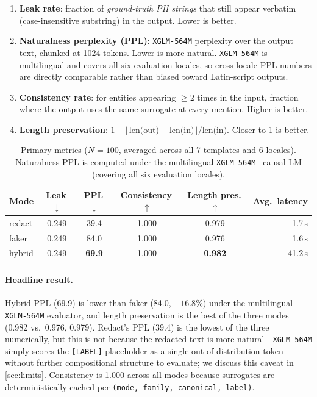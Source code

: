 \documentclass[11pt]{article}
\newcommand{\code}[1]{\texttt{#1}}
\newcommand{\xglm}{\code{XGLM-564M}}
\begin{document}
\begin{enumerate}[leftmargin=*, itemsep=2pt, topsep=2pt]
  \item \textbf{Leak rate}: fraction of \emph{ground-truth PII strings}
        that still appear verbatim (case-insensitive substring) in the
        output. Lower is better.
  \item \textbf{Naturalness perplexity (PPL)}: \xglm{} perplexity over
        the output text, chunked at 1024 tokens. Lower is more natural. \xglm{}
        is multilingual and covers all six evaluation locales, so
        cross-locale PPL numbers are directly comparable rather than
        biased toward Latin-script outputs.
  \item \textbf{Consistency rate}: for entities appearing $\ge 2$ times
        in the input, fraction where the output uses the same surrogate
        at every mention. Higher is better.
  \item \textbf{Length preservation}:
        $1 - |\,\text{len(out)} - \text{len(in)}\,| / \text{len(in)}$.
        Closer to 1 is better.
\end{enumerate}

\begin{table}[t]
\centering
\caption{Primary metrics ($N{=}100$, averaged across all 7 templates
and 6 locales). Naturalness PPL is computed under the multilingual
\xglm{}~\cite{xglm} causal LM (covering all six evaluation locales).}
\label{tab:primary}
\begin{tabular}{l c c c c r}
\toprule
\textbf{Mode} & \textbf{Leak\,$\downarrow$} & \textbf{PPL\,$\downarrow$}
& \textbf{Consistency\,$\uparrow$} & \textbf{Length pres.\,$\uparrow$}
& \textbf{Avg.\ latency} \\
\midrule
redact  & 0.249 & 39.4          & 1.000 & 0.979          & 1.7\,s  \\
faker   & 0.249 & 84.0          & 1.000 & 0.976          & 1.6\,s  \\
hybrid  & 0.249 & \textbf{69.9} & 1.000 & \textbf{0.982} & 41.2\,s \\
\bottomrule
\end{tabular}
\end{table}

\paragraph{Headline result.}
Hybrid PPL (69.9) is lower than faker (84.0, $-16.8\%$) under the
multilingual \xglm{} evaluator, and length preservation is the best
of the three modes (0.982 vs.\ 0.976, 0.979). Redact's PPL (39.4)
is the lowest of the three numerically, but this is not because
the redacted text is more natural---\xglm{} simply scores the
\code{[LABEL]} placeholder as a single out-of-distribution token
without further compositional structure to evaluate; we discuss this
caveat in \cref{sec:limits}. Consistency is 1.000 across all modes
because surrogates are deterministically cached per \code{(mode,
family, canonical, label)}.
\end{document}
